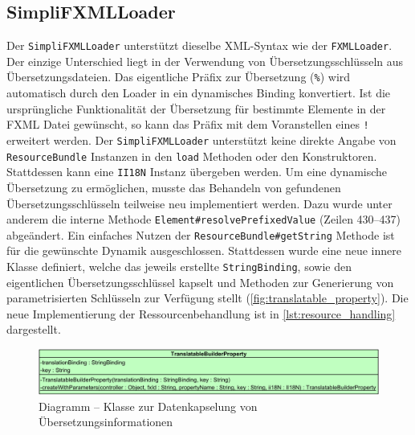 \subsection{SimpliFXMLLoader}
\label{simplifxmlloader}
Der \texttt{SimpliFXMLLoader} unterstützt dieselbe XML-Syntax wie der \texttt{FXMLLoader}. Der einzige Unterschied liegt in der Verwendung von Übersetzungsschlüsseln aus Übersetzungsdateien. Das eigentliche Präfix zur Übersetzung (\glqq\texttt{\%}\grqq) wird automatisch durch den Loader in ein dynamisches Binding konvertiert. Ist die ursprüngliche Funktionalität der Übersetzung für bestimmte Elemente in der FXML Datei gewünscht, so kann das Präfix mit dem Voranstellen eines \glqq\texttt{!}\grqq{} erweitert werden. Der \texttt{SimpliFXMLLoader} unterstützt keine direkte Angabe von \texttt{ResourceBundle} Instanzen in den \texttt{load} Methoden oder den Konstruktoren. Stattdessen kann eine \texttt{II18N} Instanz übergeben werden. Um eine dynamische Übersetzung zu ermöglichen, musste das Behandeln von gefundenen Übersetzungsschlüsseln teilweise neu implementiert werden. Dazu wurde unter anderem die interne Methode \texttt{Element\#resolvePrefixedValue} (Zeilen 430--437) abgeändert. Ein einfaches Nutzen der \texttt{ResourceBundle\#getString} Methode ist für die gewünschte Dynamik ausgeschlossen. Stattdessen wurde eine neue innere Klasse definiert, welche das jeweils erstellte \texttt{StringBinding}, sowie den eigentlichen Übersetzungsschlüssel kapselt und Methoden zur Generierung von parametrisierten Schlüsseln zur Verfügung stellt (\autoref{fig:translatable_property}). Die neue Implementierung der Ressourcenbehandlung ist in \autoref{lst:resource_handling} dargestellt.
\begin{figure}[H]
	\centering
	\includegraphics[width=\textwidth]{Abbildungen/Ressourcenbehandlung.png}
	\caption{Diagramm -- Klasse zur Datenkapselung von Übersetzungsinformationen}
	\label{fig:translatable_property}
\end{figure}
